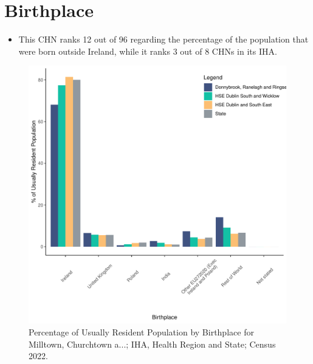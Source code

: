 \documentclass{article}
\begin{document}
\section{Birthplace}\label{sect:Birth}
\begin{itemize}
\item This CHN ranks  12 out of 96 regarding the percentage of the population that were born outside Ireland, while it ranks  3 out of 8 CHNs in its IHA.
\end{itemize}
\begin{figure}[H]
	\centering
	\includegraphics[width = 130mm]{../figures/BirthED.pdf}
	\caption{Percentage of Usually Resident Population by Birthplace for Milltown, Churchtown a...; IHA, Health Region and State; Census 2022.}
	\label{fig:vbnv}
	\end{figure}
	
\end{document}
